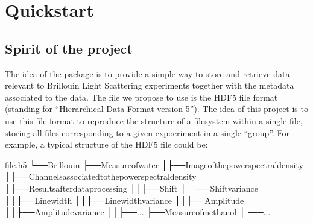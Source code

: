\documentclass[letterpaper,10pt,english]{sphinxmanual}
\begin{document}
\sphinxstepscope


\chapter{Quickstart}
\label{\detokenize{source/quickstart:quickstart}}\label{\detokenize{source/quickstart::doc}}

\section{Spirit of the project}
\label{\detokenize{source/quickstart:spirit-of-the-project}}
\sphinxAtStartPar
The idea of the package is to provide a simple way to store and retrieve data relevant to Brillouin Light Scattering experiments together with the metadata associated to the data. The file we propose to use is the HDF5 file format (standing for “Hierarchical Data Format version 5”). The idea of this project is to use this file format to reproduce the structure of a filesystem within a single file, storing all files corresponding to a given expoeriment in a single “group”. For example, a typical structure of the HDF5 file could be:

\begin{sphinxVerbatim}[commandchars=\\\{\}]
file.h5
└──Brillouin
├──Measureofwater
│├──Imageofthepowerspectraldensity
│├──Channelsassociatedtothepowerspectraldensity
│├──Resultsafterdataprocessing
││├──Shift
││├──Shiftvariance
││├──Linewidth
││├──Linewidthvariance
││├──Amplitude
││├──Amplitudevariance
││├──...
├──Measureofmethanol
│├──...
\end{sphinxVerbatim}
\end{document}
